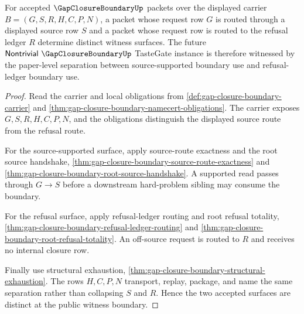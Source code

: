 \begin{theorem}
\label{thm:gap-closure-boundary-tastegate-nontrivial-witness-surface}
For accepted $\GapClosureBoundaryUp$ packets over the displayed carrier $B=(G,S,R,H,C,P,N)$, a packet whose request row $G$ is routed through a displayed source row $S$ and a packet whose request row is routed to the refusal ledger $R$ determine distinct witness surfaces. The future $\mathsf{Nontrivial}\ \GapClosureBoundaryUp$ TasteGate instance is therefore witnessed by the paper-level separation between source-supported boundary use and refusal-ledger boundary use.
\end{theorem}
\begin{proof}
Read the carrier and local obligations from \autoref{def:gap-closure-boundary-carrier} and \autoref{thm:gap-closure-boundary-namecert-obligations}. The carrier exposes $G,S,R,H,C,P,N$, and the obligations distinguish the displayed source route from the refusal route.

For the source-supported surface, apply source-route exactness and the root source handshake, \autoref{thm:gap-closure-boundary-source-route-exactness} and \autoref{thm:gap-closure-boundary-root-source-handshake}. A supported read passes through $G \longrightarrow S$ before a downstream hard-problem sibling may consume the boundary.

For the refusal surface, apply refusal-ledger routing and root refusal totality, \autoref{thm:gap-closure-boundary-refusal-ledger-routing} and \autoref{thm:gap-closure-boundary-root-refusal-totality}. An off-source request is routed to $R$ and receives no internal closure row.

Finally use structural exhaustion, \autoref{thm:gap-closure-boundary-structural-exhaustion}. The rows $H,C,P,N$ transport, replay, package, and name the same separation rather than collapsing $S$ and $R$. Hence the two accepted surfaces are distinct at the public witness boundary.
\end{proof}


